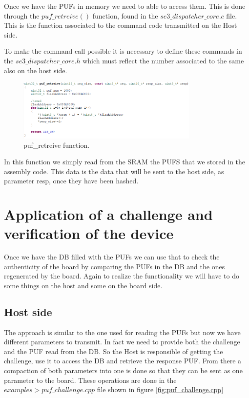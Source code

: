 Once we have the PUFs in memory we need to able to access them. This is done through the $puf\_retreive()$ function, found in the $se3\_dispatcher\_core.c$ file. This is the function associated to the command code transmitted on the Host side.

To make the command call possible it is necessary to define these commands in the $se3\_dispatcher\_core.h$ which must reflect the number associated to the same also on the host side.

\begin{figure}[h!]
	\vspace{0.5cm}
	\includegraphics[width = 0.8\textwidth]{images/puf_retreive().png}
	\caption{puf\_retreive function. }
	\label{fig:puf_retreive}
\end{figure}

In this function we simply read from the SRAM the PUFS that we stored in the assembly code. This data is the data that will be sent to the host side, as parameter resp, once they have been hashed. 


\section {Application of a challenge and verification of the device} 
\label{section:impl_host}

Once we have the DB filled with the PUFs we can use that to check the authenticity of the board by comparing the PUFs in the DB and the ones regenerated by the board. Again to realize the functionality we will have to do some things on the host and some on the board side.

\subsection{Host side}

The approach is similar to the one used for reading the PUFs but now we have different parameters to transmit. In fact we need to provide both the challenge and the PUF read from the DB. So the Host is responsible of getting the challenge, use it to access the DB and retrieve the response PUF. From there a compaction of both parameters into one is done so that they can be sent as one parameter to the board. These operations are done in the $examples > puf\_challenge.cpp$ file shown in figure \ref{fig:puf_challenge.cpp}

